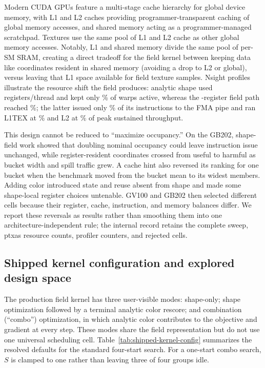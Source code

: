 Modern CUDA GPUs feature a multi-stage cache hierarchy for global device memory, with L1 and L2 caches providing programmer-transparent caching of global memory accesses, and shared memory acting as a programmer-managed scratchpad. Textures use the same pool of L1 and L2 cache as other global memory accesses. Notably, L1 and shared memory divide the same pool of per-SM SRAM, creating a direct tradeoff for the field kernel between keeping data like coordinates resident in shared memory (avoiding a drop to L2 or global), versus leaving that L1 space available for field texture samples. Nsight profiles illustrate the resource shift the field produces:
analytic shape used \AnalyticShapeRegistersPerThread{} registers/thread and
kept only \AnalyticShapeActiveWarpsPercent\% of warps active, whereas the
\FieldShapeRegistersPerThread-register field path reached
\FieldShapeActiveWarpsPercent\%; the latter issued only
\FieldShapeFmaPercent\% of its instructions to the FMA pipe and ran L1TEX at
\FieldShapeLoneTexThroughputPercent\% and L2 at \FieldShapeLtwoThroughputPercent\%
of peak sustained throughput.

This design cannot be reduced to ``maximize occupancy.'' On the GB202,
shape-field work showed that doubling nominal occupancy could leave instruction
issue unchanged, while register-resident coordinates crossed from useful to
harmful as bucket width and spill traffic grew. A cache hint also reversed its
ranking for one bucket when the benchmark moved from the bucket mean to its
widest members. Adding color introduced state and reuse absent from shape and
made some shape-local register choices untenable. GV100 and GB202 then selected
different cells because their register, cache, instruction, and memory balances
differ. We report these reversals as results rather than smoothing them into one
architecture-independent rule; the internal record retains the complete sweep,
ptxas resource counts, profiler counters, and rejected cells.

\subsection{Shipped kernel configuration and explored design space}
\label{app:kernel-config}

The production field kernel has three user-visible modes: shape-only; shape
optimization followed by a terminal analytic color rescore; and combination
(``combo'') optimization, in which analytic color contributes to the objective
and gradient at every step. These modes share the field representation but do
not use one universal scheduling cell. Table~\ref{tab:shipped-kernel-config}
summarizes the resolved defaults for the standard four-start search. For a
one-start combo search, $S$ is clamped to one rather than leaving three of four
groups idle.

